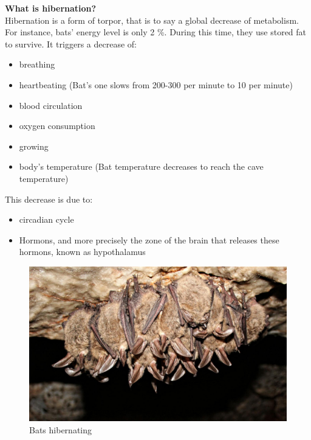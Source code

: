 \documentclass[draft, final]{report}
\begin{document}
\textbf{What is hibernation?}\\

Hibernation is a form of torpor, that is to say a global decrease of metabolism. For instance, bats’ energy level is only 2 \%. During this time,  they use stored fat to survive.
It triggers a decrease of:
\begin{itemize}
  \item breathing
  \item heartbeating (Bat's one slows from 200-300 per minute to 10 per minute)
  \item blood circulation
  \item oxygen consumption
  \item growing
  \item body’s temperature (Bat temperature decreases to reach the cave temperature)
\end{itemize}

This decrease is due to:
\begin{itemize}
  \item circadian cycle
  \item Hormons, and more precisely the zone of the brain that releases these hormons, known as hypothalamus
\end{itemize}
\begin{figure}[!ht]
  \centering
  \includegraphics[scale=0.25]{LateX/Images/bathibernation.png}
  \caption{Bats hibernating\cite{bathibernating}}
\end{figure}
\end{document}
